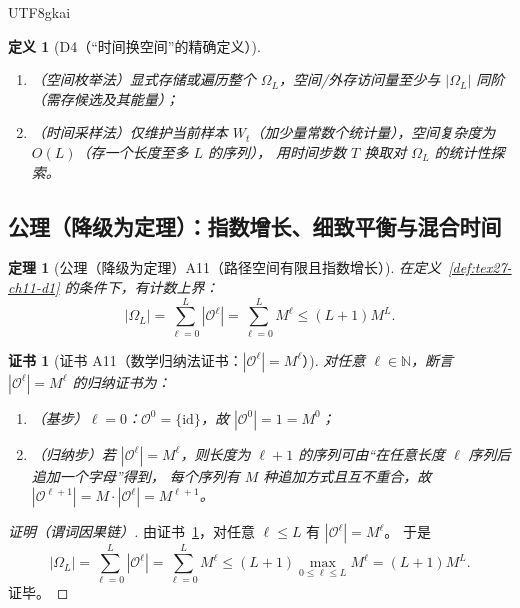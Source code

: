 \documentclass[12pt]{article}
\newtheorem{definition}{定义}[section]
\newtheorem{theorem}{定理}[section]
\newtheorem{Certificate}{证书}[section]
\newcommand{\NN}{\mathbb{N}}
\begin{document}
\begin{CJK*}{UTF8}{gkai}
\begin{definition}[D4（“时间换空间”的精确定义）]
\label{def:tex27-ch11-d4}
\begin{enumerate}
  \item（空间枚举法）显式存储或遍历整个 $\Omega_L$，空间/外存访问量至少与 $|\Omega_L|$ 同阶（需存候选及其能量）；
  \item（时间采样法）仅维护当前样本 $W_t$（加少量常数个统计量），空间复杂度为 $O(L)$（存一个长度至多 $L$ 的序列），
  用时间步数 $T$ 换取对 $\Omega_L$ 的统计性探索。
\end{enumerate}
\end{definition}

\subsection{公理（降级为定理）：指数增长、细致平衡与混合时间}
\label{subsec:tex27-ch11-axioms}

\begin{theorem}[公理（降级为定理）A11（路径空间有限且指数增长）]
\label{thm:tex27-ch11-a11}
在定义~\ref{def:tex27-ch11-d1} 的条件下，有计数上界：
\[
  |\Omega_L|
  =\sum_{\ell=0}^{L}|\mathcal{O}^{\ell}|
  =\sum_{\ell=0}^{L} M^\ell
  \le (L+1)M^L.
\]
\end{theorem}

\begin{Certificate}[证书 A11（数学归纳法证书：$|\mathcal{O}^\ell|=M^\ell$）]
\label{cert:tex27-ch11-a11}
对任意 $\ell\in\NN$，断言 $|\mathcal{O}^\ell|=M^\ell$ 的归纳证书为：
\begin{enumerate}
  \item（基步）$\ell=0$：$\mathcal{O}^0=\{\mathrm{id}\}$，故 $|\mathcal{O}^0|=1=M^0$；
  \item（归纳步）若 $|\mathcal{O}^\ell|=M^\ell$，则长度为 $\ell+1$ 的序列可由“在任意长度 $\ell$ 序列后追加一个字母”得到，
  每个序列有 $M$ 种追加方式且互不重合，故 $|\mathcal{O}^{\ell+1}|=M\cdot|\mathcal{O}^{\ell}|=M^{\ell+1}$。
\end{enumerate}
\end{Certificate}

\begin{proof}[证明（谓词因果链）]
由证书~\ref{cert:tex27-ch11-a11}，对任意 $\ell\le L$ 有 $|\mathcal{O}^\ell|=M^\ell$。
于是
\[
  |\Omega_L|
  =\sum_{\ell=0}^{L}|\mathcal{O}^{\ell}|
  =\sum_{\ell=0}^{L} M^\ell
  \le (L+1)\max_{0\le \ell\le L}M^\ell
  =(L+1)M^L.
\]
证毕。
\end{proof}


\end{CJK*}
\end{document}
